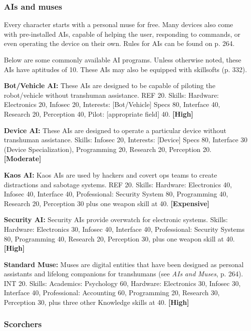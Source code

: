 \subsubsection{AIs and muses} 

Every character starts with a personal muse for free. Many devices also come with pre-installed AIs, capable of helping the user, responding to commands, or even operating the device on their own. Rules for AIs can be found on p. 264. 

Below are some commonly available AI programs. Unless otherwise noted, these AIs have aptitudes of 10. These AIs may also be equipped with skillsofts (p. 332). 

\textbf{Bot/Vehicle AI:} These AIs are designed to be capable of piloting the robot/vehicle without transhuman assistance. REF 20. Skills: Hardware: Electronics 20, Infosec 20, Interests: [Bot/Vehicle] Specs 80, Interface 40, Research 20, Perception 40, Pilot: [appropriate field] 40. \textbf{[High]} 

\textbf{Device AI:} These AIs are designed to operate a particular device without transhuman assistance. Skills: Infosec 20, Interests: [Device] Specs 80, Interface 30 (Device Specialization), Programming 20, Research 20, Perception 20. \textbf{[Moderate]} 

\textbf{Kaos AI:} Kaos AIs are used by hackers and covert ops teams to create distractions and sabotage systems. REF 20. Skills: Hardware: Electronics 40, Infosec 40, Interface 40, Professional: Security System 80, Programming 40, Research 20, Perception 30 plus one weapon skill at 40. \textbf{[Expensive]} 

\textbf{Security AI:} Security AIs provide overwatch for electronic systems. Skills: Hardware: Electronics 30, Infosec 40, Interface 40, Professional: Security Systems 80, Programming 40, Research 20, Perception 30, plus one weapon skill at 40. \textbf{[High]} 

\textbf{Standard Muse:} Muses are digital entities that have been designed as personal assistants and lifelong companions for transhumans (see \emph{AIs and Muses}, p. 264). INT 20. Skills: Academics: Psychology 60, Hardware: Electronics 30, Infosec 30, Interface 40, Professional: Accounting 60, Programming 20, Research 30, Perception 30, plus three other Knowledge skills at 40. \textbf{[High]} 

\subsubsection{Scorchers} 

